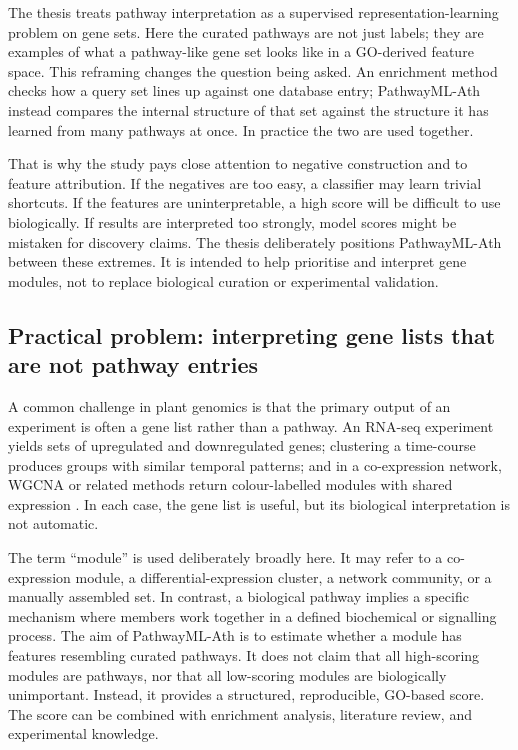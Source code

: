 \documentclass[12pt,twoside]{article}
\begin{document}
The thesis treats pathway interpretation as a supervised representation-learning problem on gene sets. Here the curated pathways are not just labels; they are examples of what a pathway-like gene set looks like in a GO-derived feature space. This reframing changes the question being asked. An enrichment method checks how a query set lines up against one database entry; PathwayML-Ath instead compares the internal structure of that set against the structure it has learned from many pathways at once. In practice the two are used together.

That is why the study pays close attention to negative construction and to feature attribution. If the negatives are too easy, a classifier may learn trivial shortcuts. If the features are uninterpretable, a high score will be difficult to use biologically. If results are interpreted too strongly, model scores might be mistaken for discovery claims. The thesis deliberately positions PathwayML-Ath between these extremes. It is intended to help prioritise and interpret gene modules, not to replace biological curation or experimental validation.

\subsection{Practical problem: interpreting gene lists that are not pathway entries}
\label{sec:bg_practical_problem}

A common challenge in plant genomics is that the primary output of an experiment is often a gene list rather than a pathway. An RNA-seq experiment yields sets of upregulated and downregulated genes; clustering a time-course produces groups with similar temporal patterns; and in a co-expression network, WGCNA or related methods return colour-labelled modules with shared expression \citep{langfelder2008wgcna,obayashi2018atted,liesecke2018ranking}. In each case, the gene list is useful, but its biological interpretation is not automatic.

The term ``module'' is used deliberately broadly here. It may refer to a co-expression module, a differential-expression cluster, a network community, or a manually assembled set. In contrast, a biological pathway implies a specific mechanism where members work together in a defined biochemical or signalling process. The aim of PathwayML-Ath is to estimate whether a module has features resembling curated pathways. It does not claim that all high-scoring modules are pathways, nor that all low-scoring modules are biologically unimportant. Instead, it provides a structured, reproducible, GO-based score. The score can be combined with enrichment analysis, literature review, and experimental knowledge.
\end{document}
